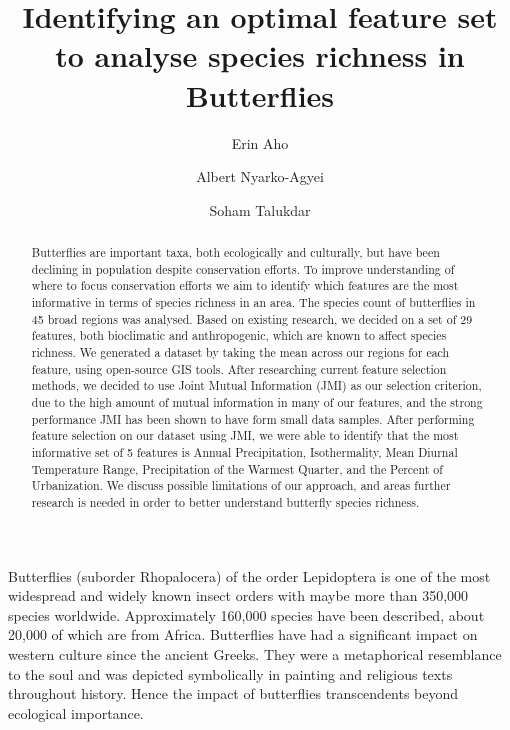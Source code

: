 \documentclass[prl,showpacs,superscriptaddress,twocolumn,longbibliography]{revtex4-1}
\begin{document}
\author{Erin Aho}
\author{Albert Nyarko-Agyei}
\author{Soham Talukdar}

\title{Identifying an optimal feature set to analyse species richness in Butterflies}


\begin{abstract}
Butterflies are important taxa, both ecologically and culturally, but have been declining in population despite conservation efforts. To improve understanding of where to focus conservation efforts we aim to identify which features are the most informative in terms of species richness in an area.
The species count of butterflies in 45 broad regions was analysed. Based on existing research, we decided on a set of 29 features, both bioclimatic and anthropogenic, which are known to affect species richness. We generated a dataset by taking the mean across our regions for each feature, using open-source GIS tools. After researching current feature selection methods, we decided to use Joint Mutual Information (JMI) as our selection criterion, due to the high amount of mutual information in many of our features, and the strong performance JMI has been shown to have form small data samples. After performing feature selection on our dataset using JMI, we were able to identify that the most informative set of 5 features is Annual Precipitation, Isothermality, Mean Diurnal Temperature Range, Precipitation of the Warmest Quarter, and the Percent of Urbanization. We discuss possible limitations of our approach, and areas further research is needed in order to better understand butterfly species richness.
\end{abstract}

\maketitle

Butterflies (suborder Rhopalocera) of the order Lepidoptera is one of the most widespread and widely known insect orders with maybe more than 350,000 species worldwide. Approximately 160,000 species have been described, about 20,000 of which are from Africa\cite{Arnold}. Butterflies have had a significant impact on western culture since the ancient Greeks. They were a metaphorical resemblance to the soul and was depicted symbolically in painting and religious texts throughout history\cite{Dicke2000}. Hence the impact of butterflies transcendents beyond ecological importance.
\end{document}
